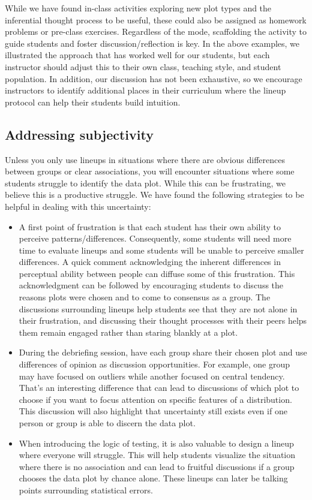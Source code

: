 \documentclass[12pt]{article}
\begin{document}
While we have found in-class activities exploring new plot types and the
inferential thought process to be useful, these could also be assigned
as homework problems or pre-class exercises. Regardless of the mode,
scaffolding the activity to guide students and foster
discussion/reflection is key. In the above examples, we illustrated the
approach that has worked well for our students, but each instructor
should adjust this to their own class, teaching style, and student
population. In addition, our discussion has not been exhaustive, so we
encourage instructors to identify additional places in their curriculum
where the lineup protocol can help their students build intuition.

\hypertarget{addressing-subjectivity}{%
\subsection{Addressing subjectivity}\label{addressing-subjectivity}}

Unless you only use lineups in situations where there are obvious
differences between groups or clear associations, you will encounter
situations where some students struggle to identify the data plot. While
this can be frustrating, we believe this is a productive struggle. We
have found the following strategies to be helpful in dealing with this
uncertainty:

\begin{itemize}
\item
  A first point of frustration is that each student has their own
  ability to perceive patterns/differences. Consequently, some students
  will need more time to evaluate lineups and some students will be
  unable to perceive smaller differences. A quick comment acknowledging
  the inherent differences in perceptual ability between people can
  diffuse some of this frustration. This acknowledgment can be followed
  by encouraging students to discuss the reasons plots were chosen and
  to come to consensus as a group. The discussions surrounding lineups
  help students see that they are not alone in their frustration, and
  discussing their thought processes with their peers helps them remain
  engaged rather than staring blankly at a plot.
\item
  During the debriefing session, have each group share their chosen plot
  and use differences of opinion as discussion opportunities. For
  example, one group may have focused on outliers while another focused
  on central tendency. That's an interesting difference that can lead to
  discussions of which plot to choose if you want to focus attention on
  specific features of a distribution. This discussion will also
  highlight that uncertainty still exists even if one person or group is
  able to discern the data plot.
\item
  When introducing the logic of testing, it is also valuable to design a
  lineup where everyone will struggle. This will help students visualize
  the situation where there is no association and can lead to fruitful
  discussions if a group chooses the data plot by chance alone. These
  lineups can later be talking points surrounding statistical errors.
\end{itemize}
\end{document}
